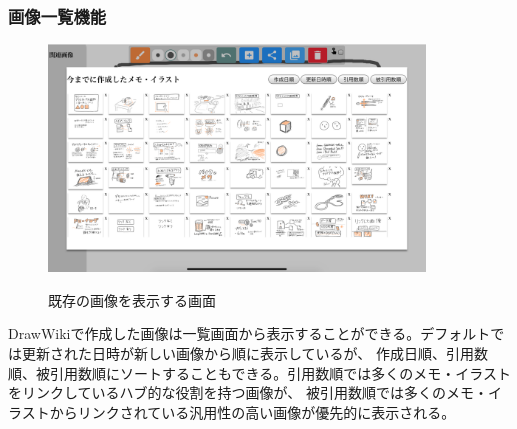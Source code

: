\subsubsection{画像一覧機能}

\begin{figure}[htbp]
    \begin{center}
    {\includegraphics[width=100mm]{images/drawwikiimagelist.png}} \end{center}
    \caption{既存の画像を表示する画面}
    \label{imagelistview}
\end{figure}

DrawWikiで作成した画像は一覧画面から表示することができる。デフォルトでは更新された日時が新しい画像から順に表示しているが、
作成日順、引用数順、被引用数順にソートすることもできる。引用数順では多くのメモ・イラストをリンクしているハブ的な役割を持つ画像が、
被引用数順では多くのメモ・イラストからリンクされている汎用性の高い画像が優先的に表示される。